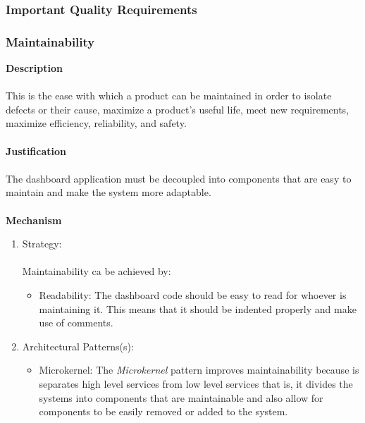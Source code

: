 		\subsubsection{Important Quality Requirements}
			\subsubsection*{Maintainability}
			\textbf{Description}\\\\
			This is the ease with which a product can be maintained in order to isolate defects or their cause, maximize a product's useful life, meet new requirements, maximize efficiency, reliability, and safety.\\\\
			\textbf{Justification}\\\\
			The dashboard application must be decoupled into components that are easy to maintain and make the system more adaptable.\\\\
			\textbf{Mechanism}
			\begin{enumerate}
				\item Strategy:\\\\
				Maintainability ca be achieved by:
				\begin{itemize}
				\item Readability: The dashboard code should be easy to read for whoever is maintaining it. This means that it should be indented properly and make use of comments. 
				\end{itemize}
				\item Architectural Patterns(s):
				\begin{itemize}
				\item Microkernel: The \emph{Microkernel} pattern improves maintainability because is separates high level services  from low level services that is, it divides the systems into components that are maintainable and also allow for components to be easily removed or added to the system.
				\end{itemize}
			\end{enumerate}
			\newpage

